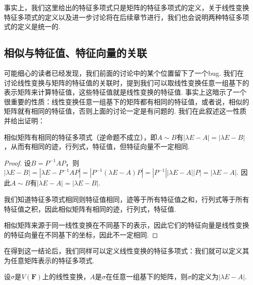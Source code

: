 事实上，我们这里给出的特征多项式只是矩阵的特征多项式的定义，关于线性变换特征多项式的定义以及进一步讨论将在后续章节进行，我们也会说明两种特征多项式的定义是统一的.

\subsection{相似与特征值、特征向量的关联}
可能细心的读者已经发现，我们前面的讨论中的某个位置留下了一个bug. 我们在讨论线性变换与矩阵的特征值的关联时，提到我们可以取线性变换任意一组基下的表示矩阵来计算特征值，这些特征值就是线性变换的特征值. 事实上这暗示了一个很重要的性质：线性变换任意一组基下的矩阵都有相同的特征值，或者说，相似的矩阵就有相同的特征值，否则上面的讨论一定是有问题的. 我们在此叙述这一性质并给出证明：
\begin{theorem}{}{}
    相似矩阵有相同的特征多项式（逆命题不成立），即$A\sim B$有$|\lambda E-A|=|\lambda E-B|$，从而有相同的迹，行列式，特征值，但特征向量不一定相同.
\end{theorem}
\begin{proof}
    设$B=P^{-1}AP$，则$|\lambda E-B|=|\lambda E-P^{-1}AP|=|P^{-1}(\lambda E-A)P|=|P^{-1}||\lambda E-A||P|=|\lambda E-A|$. 因此$A\sim B$有$|\lambda E-A|=|\lambda E-B|$.

    我们知道特征多项式相同则特征值相同，迹等于所有特征值之和，行列式等于所有特征值之积，因此相似矩阵有相同的迹，行列式，特征值.

    相似矩阵来源于同一线性变换在不同基下的表示，因此它们的特征向量是线性变换的特征向量在不同基下的坐标，因此不一定相同.
\end{proof}

在得到这一结论后，我们同样可以定义线性变换的特征多项式：我们就可以定义其为任意矩阵表示的特征多项式.
\begin{definition}{}{}
    设$\sigma$是$V(\mathbf{F})$上的线性变换，$A$是$\sigma$在任意一组基下的矩阵，则$\sigma$的定义为$|\lambda E-A|$.
\end{definition}

